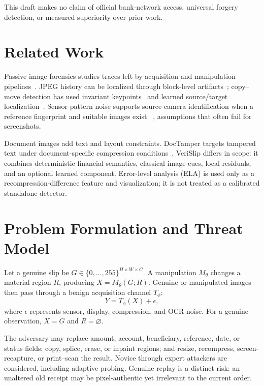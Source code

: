 \documentclass[conference]{IEEEtran}
\begin{document}
This draft makes no claim of official bank-network access, universal forgery
detection, or measured superiority over prior work.

\section{Related Work}
Passive image forensics studies traces left by acquisition and manipulation
pipelines~\cite{farid2009survey,verdoliva2020media}. JPEG history can be localized
through block-level artifacts~\cite{bianchi2012jpeg}; copy--move detection has
used invariant keypoints~\cite{amerini2011sift} and learned source/target
localization~\cite{wu2018busternet}. Sensor-pattern noise supports source-camera
identification when a reference fingerprint and suitable images exist
~\cite{lukas2006prnu}, assumptions that often fail for screenshots.

Document images add text and layout constraints. DocTamper targets tampered text
under document-specific compression conditions~\cite{qu2023doctamper}. VeriSlip
differs in scope: it combines deterministic financial semantics, classical image
cues, local residuals, and an optional learned component. Error-level analysis
(ELA) is used only as a recompression-difference feature and visualization; it is
not treated as a calibrated standalone detector.

\section{Problem Formulation and Threat Model}
Let a genuine slip be $G\in\{0,\ldots,255\}^{H\times W\times C}$. A manipulation
$M_\theta$ changes a material region $R$, producing $X=M_\theta(G;R)$. Genuine or
manipulated images then pass through a benign acquisition channel $T_\phi$:
\begin{equation}
  Y=T_\phi(X)+\epsilon,
\end{equation}
where $\epsilon$ represents sensor, display, compression, and OCR noise. For a
genuine observation, $X=G$ and $R=\varnothing$.

The adversary may replace amount, account, beneficiary, reference, date, or
status fields; copy, splice, erase, or inpaint regions; and resize, recompress,
screen-recapture, or print--scan the result. Novice through expert attackers are
considered, including adaptive probing. Genuine replay is a distinct risk: an
unaltered old receipt may be pixel-authentic yet irrelevant to the current order.
\end{document}
